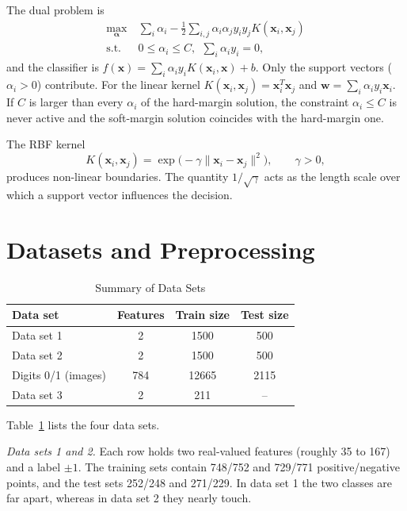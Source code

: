 \documentclass[conference,a4paper]{IEEEtran}
\begin{document}
The dual problem is
\begin{equation}
\begin{aligned}
\max_{\boldsymbol{\alpha}}\ & \sum_i\alpha_i-\tfrac12\sum_{i,j}\alpha_i\alpha_j y_i y_j K(\mathbf{x}_i,\mathbf{x}_j)\\
\text{s.t.}\ & 0\le\alpha_i\le C,\ \ \sum_i\alpha_i y_i=0,
\end{aligned}
\label{eq:dual}
\end{equation}
and the classifier is $f(\mathbf{x})=\sum_i\alpha_i y_i K(\mathbf{x}_i,\mathbf{x})+b$. Only the support vectors
($\alpha_i>0$) contribute. For the linear kernel $K(\mathbf{x}_i,\mathbf{x}_j)=\mathbf{x}_i^{T}\mathbf{x}_j$ and
$\mathbf{w}=\sum_i\alpha_i y_i\mathbf{x}_i$. If $C$ is larger than every $\alpha_i$ of the hard-margin solution,
the constraint $\alpha_i\le C$ is never active and the soft-margin solution coincides with the hard-margin one.

The RBF kernel
\begin{equation}
K(\mathbf{x}_i,\mathbf{x}_j)=\exp\!\big(-\gamma\|\mathbf{x}_i-\mathbf{x}_j\|^2\big),\qquad\gamma>0,
\label{eq:rbf}
\end{equation}
produces non-linear boundaries. The quantity $1/\sqrt{\gamma}$ acts as the length scale over which a support vector
influences the decision.

\section{Datasets and Preprocessing}
\begin{table}[!t]
\caption{Summary of Data Sets}
\label{tab:data}
\centering
\begin{tabular}{@{}lccc@{}}
\toprule
Data set & Features & Train size & Test size\\
\midrule
Data set 1 & 2 & 1500 & 500\\
Data set 2 & 2 & 1500 & 500\\
Digits 0/1 (images) & 784 & 12665 & 2115\\
Data set 3 & 2 & 211 & --\\
\bottomrule
\end{tabular}
\end{table}

Table~\ref{tab:data} lists the four data sets.

\emph{Data sets 1 and 2.} Each row holds two real-valued features (roughly 35 to 167) and a label $\pm1$. The
training sets contain 748/752 and 729/771 positive/negative points, and the test sets 252/248 and 271/229.
In data set 1 the two classes are far apart, whereas in data set 2 they nearly touch.
\end{document}
